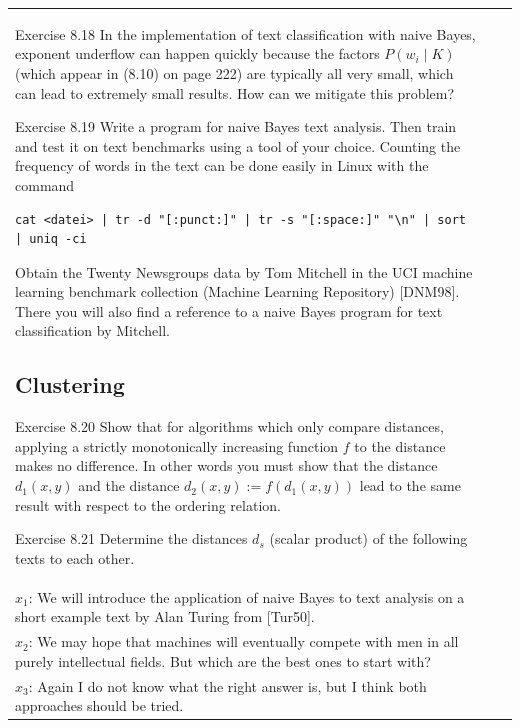 \documentclass[10pt]{book}
\begin{document}
\begin{center}
\begin{tabular}{|l|l|l|}
Exercise 8.18 In the implementation of text classification with naive Bayes, exponent underflow can happen quickly because the factors $P\left(w_{i} \mid K\right)$ (which appear in (8.10) on page 222) are typically all very small, which can lead to extremely small results. How can we mitigate this problem?

Exercise 8.19 Write a program for naive Bayes text analysis. Then train and test it on text benchmarks using a tool of your choice. Counting the frequency of words in the text can be done easily in Linux with the command

\begin{verbatim}
cat <datei> | tr -d "[:punct:]" | tr -s "[:space:]" "\n" | sort | uniq -ci
\end{verbatim}

Obtain the Twenty Newsgroups data by Tom Mitchell in the UCI machine learning benchmark collection (Machine Learning Repository) [DNM98]. There you will also find a reference to a naive Bayes program for text classification by Mitchell.

\subsection{Clustering}
Exercise 8.20 Show that for algorithms which only compare distances, applying a strictly monotonically increasing function $f$ to the distance makes no difference. In other words you must show that the distance $d_{1}(x, y)$ and the distance $d_{2}(x, y):= f\left(d_{1}(x, y)\right)$ lead to the same result with respect to the ordering relation.

Exercise 8.21 Determine the distances $d_{s}$ (scalar product) of the following texts to each other.\\
$x_{1}$: We will introduce the application of naive Bayes to text analysis on a short example text by Alan Turing from [Tur50].\\
$x_{2}$: We may hope that machines will eventually compete with men in all purely intellectual fields. But which are the best ones to start with?\\
$x_{3}$: Again I do not know what the right answer is, but I think both approaches should be tried.


\end{tabular}
\end{center}
\end{document}
